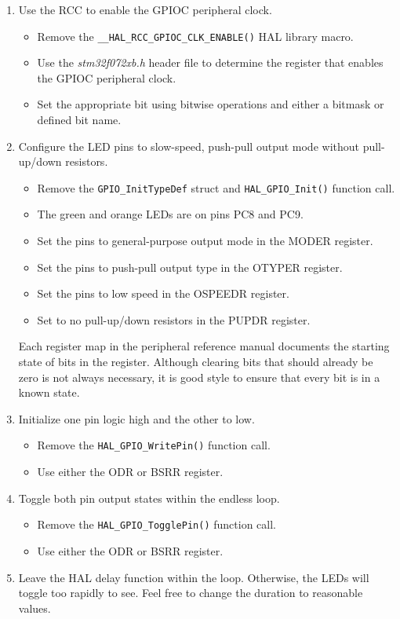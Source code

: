 \documentclass[openany,11pt,fleqn]{book} %
\begin{document}
\begin{enumerate}
    
    \item Use the RCC to enable the GPIOC peripheral clock.
    \begin{itemize}
        \item Remove the \texttt{\_\_HAL\_RCC\_GPIOC\_CLK\_ENABLE()} HAL library macro.
        \item Use the \textit{stm32f072xb.h} header file to determine the register that enables the GPIOC peripheral clock.
        \item Set the appropriate bit using bitwise operations and either a bitmask or defined bit name. 
    \end{itemize}
    \item Configure the LED pins to slow-speed, push-pull output mode without pull-up/down resistors.
    \begin{itemize}
        \item Remove the \texttt{GPIO\_InitTypeDef} struct and \texttt{HAL\_GPIO\_Init()} function call.
        \item The green and orange LEDs are on pins PC8 and PC9.
        \item Set the pins to general-purpose output mode in the MODER register. 
        \item Set the pins to push-pull output type in the OTYPER register.
        \item Set the pins to low speed in the OSPEEDR register. 
        \item Set to no pull-up/down resistors in the PUPDR register. 
    \end{itemize}

    Each register map in the peripheral reference manual documents the starting state of bits in the register. Although clearing bits that should already be zero is not always necessary, it is good style to ensure that every bit is in a known state.  
    \medskip

    \item Initialize one pin logic high and the other to low.
    \begin{itemize}
        \item Remove the \texttt{HAL\_GPIO\_WritePin()} function call.
        \item Use either the ODR or BSRR register.  
    \end{itemize}
    \item Toggle both pin output states within the endless loop.
    \begin{itemize}
        \item Remove the \texttt{HAL\_GPIO\_TogglePin()} function call.
        \item Use either the ODR or BSRR register. 
    \end{itemize}
    \item Leave the HAL delay function within the loop. Otherwise, the LEDs will toggle too rapidly to see. Feel free to change the duration to reasonable values.
\end{enumerate}
\end{document}
